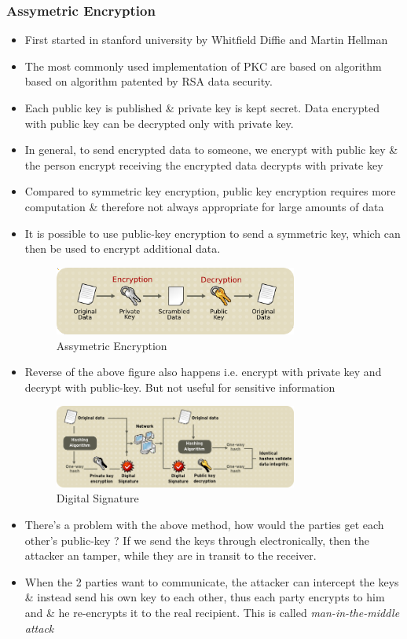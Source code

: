\documentclass[a4paper]{article}
\begin{document}
\subsubsection{Assymetric Encryption}
\begin{itemize}
    \item First started in stanford university by Whitfield Diffie and Martin Hellman
    \item The most commonly used implementation of PKC are based on algorithm based on algorithm patented by RSA data security.
    \item Each public key is published \& private key is kept secret. Data encrypted with public key can be decrypted only with private key.
    \item In general, to send encrypted data to someone, we encrypt with public key \& the person encrypt receiving the 
        encrypted data decrypts with private key
    \item Compared to symmetric key encryption, public key encryption requires more computation \& therefore not always appropriate for large amounts of data
    \item It is possible to use public-key encryption to send a symmetric key, which can then be used to encrypt additional data.
        \begin{figure}[h]
            \centering
            \includegraphics[width=80mm]{assymetric.png}
            \caption{Assymetric Encryption}
        \end{figure}
    \item Reverse of the above figure also happens i.e. encrypt with private key and decrypt with public-key. But not useful for sensitive information
        \begin{figure}[h]
        \centering
        \includegraphics[width=80mm]{digitalsignature.png}
        \caption{Digital Signature}
        \end{figure}
    \item There's a problem with the above method, how would the parties get each other's public-key ? 
        If we send the keys through electronically, then the attacker an tamper, while they are in transit to the receiver.
    \item When the 2 parties want to communicate, the attacker can intercept the keys \& instead send his own key to each other, 
        thus each party encrypts to him and \& he re-encrypts it to the real recipient. 
        This is called \textit{man-in-the-middle attack}
\end{itemize}
\end{document}
